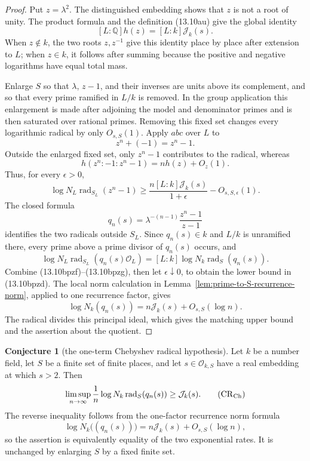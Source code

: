 \documentclass[11pt,reqno]{amsart}
\theoremstyle{definition}
\newtheorem{conjecture}[theorem]{Conjecture}
\theoremstyle{remark}
\newcommand{\Q}{\mathbb Q}
\newcommand{\cO}{\mathcal O}
\begin{document}
\begin{proof}
Put \(z=\lambda^2\).  The distinguished embedding shows that \(z\) is not
a root of unity.  The product formula and the definition (13.10au) give
the global identity
\[
 [L:\Q]h(z)=[L:k]\mathcal J_k(s).
\tag{13.10bpze}
\]
When \(z\notin k\), the two roots \(z,z^{-1}\) give this identity
place by place after extension to \(L\); when \(z\in k\), it follows after
summing because the positive and negative logarithms have equal total mass.

Enlarge \(S\) so that \(\lambda\), \(z-1\), and their inverses are units
above its complement, and so that every prime ramified in \(L/k\) is
removed.  In the group application this enlargement is made after adjoining
the model and denominator primes and is then saturated over rational
primes.  Removing this fixed set changes every logarithmic radical by only
\(O_{s,S}(1)\).  Apply \(abc\) over \(L\) to
\[
 z^n+(-1)=z^n-1.
\]
Outside the enlarged fixed set, only \(z^n-1\) contributes to the radical,
whereas
\[
 h(z^n:-1:z^n-1)=nh(z)+O_z(1).
\]
Thus, for every \(\epsilon>0\),
\[
 \log N_L\operatorname{rad}_{S_L}(z^n-1)
 \ge\frac{n[L:k]\mathcal J_k(s)}{1+\epsilon}
      -O_{s,S,\epsilon}(1).
\tag{13.10bpzf}
\]
The closed formula
\[
 q_n(s)=\lambda^{-(n-1)}\frac{z^n-1}{z-1}
\]
identifies the two radicals outside \(S_L\).  Since \(q_n(s)\in k\) and
\(L/k\) is unramified there, every prime above a prime divisor of \(q_n(s)\)
occurs, and
\[
 \log N_L\operatorname{rad}_{S_L}(q_n(s)\cO_L)
 =[L:k]\log N_k\operatorname{rad}_S(q_n(s)).
\tag{13.10bpzg}
\]
Combine (13.10bpzf)--(13.10bpzg), then let
\(\epsilon\downarrow0\), to obtain the lower bound in (13.10bpzd).  The
local norm calculation in
Lemma~\ref{lem:prime-to-S-recurrence-norm}, applied to one recurrence
factor, gives
\[
 \log N_k(q_n(s))=n\mathcal J_k(s)+O_{s,S}(\log n).
\]
The radical divides this principal ideal, which gives the matching upper
bound and the assertion about the quotient.
\end{proof}

\begin{conjecture}[the one-term Chebyshev radical hypothesis]
\label{conj:chebyshev-radical}
Let \(k\) be a number field, let \(S\) be a finite set of finite places,
and let \(s\in\cO_{k,S}\) have a real embedding at which \(s>2\).  Then
\[
 \limsup_{n\to\infty}\frac1n
 \log N_k\operatorname{rad}_S(q_n(s))
 \ge\mathcal J_k(s).
\tag{\(\mathrm{CR}_{\mathrm{Ch}}\)}
\]
The reverse inequality follows from the one-factor recurrence norm formula
\[
 \log N_k\bigl((q_n(s))\bigr)
 =n\mathcal J_k(s)+O_{s,S}(\log n),
\]
so the assertion is equivalently equality of the two exponential rates.
It is unchanged by enlarging \(S\) by a fixed finite set.
\end{conjecture}
\end{document}
